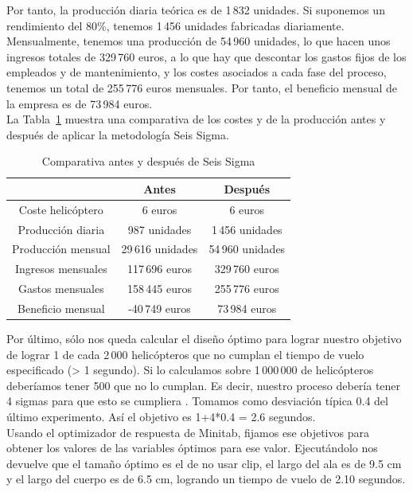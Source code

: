 \documentclass[12pt,a4paper,twoside,openright,titlepage,final]{article}
\begin{document}
Por tanto, la producción diaria teórica es de 1\,832 unidades. Si suponemos un rendimiento del 80\%, tenemos 1\,456 unidades fabricadas diariamente.\\

Mensualmente, tenemos una producción de 54\,960 unidades, lo que hacen unos ingresos totales de 329\,760 euros, a lo que hay que descontar los gastos fijos de los empleados y de mantenimiento, y los costes asociados a cada fase del proceso, tenemos un total de 255\,776 euros mensuales. Por tanto, el beneficio mensual de la empresa es de 73\,984 euros.\\

La Tabla~\ref{tbl:comparativa} muestra una comparativa de los costes y de la producción antes y después de aplicar la metodología Seis Sigma.\\

\begin{table}[htbp!]
	\centering
	\caption{Comparativa antes y después de Seis Sigma}
	\label{tbl:comparativa}
	\begin{tabular}{@{}ccc@{}}
		\cmidrule(l){2-3}
		& Antes             & Después          \\ \midrule
		Coste helicóptero  & 6 euros           & 6 euros          \\
		Producción diaria  & 987 unidades      & 1\,456 unidades  \\
		Producción mensual & 29\,616  unidades & 54\,960 unidades \\
		Ingresos mensuales & 117\,696 euros    & 329\,760 euros   \\
		Gastos mensuales   & 158\,445 euros    & 255\,776 euros   \\
		Beneficio mensual  & -40\,749 euros    & 73\,984 euros    \\ \bottomrule
	\end{tabular}
\end{table}

Por último, sólo nos queda calcular el diseño óptimo para lograr nuestro objetivo de lograr 1 de cada 2\,000 helicópteros que no cumplan el tiempo de vuelo especificado (> 1 segundo). Si lo calculamos sobre 1\,000\,000 de helicópteros deberíamos tener 500 que no lo cumplan. Es decir, nuestro proceso debería tener 4 sigmas para que esto se cumpliera \cite{Sigma}. Tomamos como desviación típica 0.4 del último experimento. Así el objetivo es 1+4*0.4 = 2.6 segundos.\\

Usando el optimizador de respuesta de Minitab, fijamos ese objetivos para obtener los valores de las variables óptimos para ese valor. Ejecutándolo nos devuelve que el tamaño óptimo es el de no usar clip, el largo del ala es de 9.5 cm y el largo del cuerpo es de 6.5 cm, logrando un tiempo de vuelo de 2.10 segundos. 
 
\end{document}
